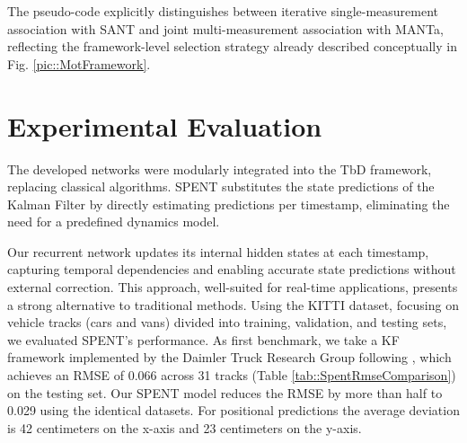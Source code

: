 \documentclass[letterpaper, 10 pt, journal, twoside]{IEEEtran}
\begin{document}
The pseudo-code explicitly distinguishes between iterative single-measurement association with \ac{SANT} and joint multi-measurement association with \ac{MANTa}, reflecting the framework-level selection strategy already described conceptually in Fig. {\ref{pic::MotFramework}}.

\section{Experimental Evaluation}
The developed networks were modularly integrated into the \ac{TbD} framework, replacing classical algorithms.
\ac{SPENT} substitutes the state predictions of the Kalman Filter by directly estimating predictions per timestamp, eliminating the need for a predefined dynamics model.

\begin{table}[ht!]
    \centering
    \caption{Comparison of the \ac{RMSE} for \ac{SPENT} and a \ac{KF} framework implemented by the Daimler Truck Research Group following {\cite{KF_BoundingBD.2023,KF_Bewley.2016}}.}
    \label{tab::SpentRmseComparison}
\end{table}
Our recurrent network updates its internal hidden states at each timestamp, capturing temporal dependencies and enabling accurate state predictions without external correction.
This approach, well-suited for real-time applications, presents a strong alternative to traditional methods.
Using the KITTI dataset, focusing on vehicle tracks (cars and vans) divided into training, validation, and testing sets, we evaluated \ac{SPENT}'s performance.
As first benchmark, we take a \ac{KF} framework implemented by the Daimler Truck Research Group following {\cite{KF_BoundingBD.2023,KF_Bewley.2016}}, which achieves an \ac{RMSE} of 0.066 across 31 tracks (Table {\ref{tab::SpentRmseComparison}}) on the testing set.
Our \ac{SPENT} model reduces the RMSE by more than half to 0.029 using the identical datasets.
For positional predictions the average deviation is 42 centimeters on the x-axis and 23 centimeters on the y-axis.
\end{document}
